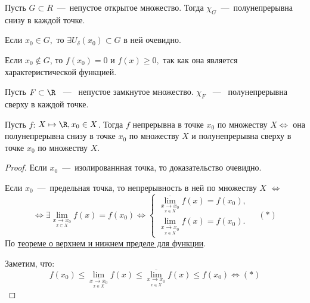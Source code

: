 \begin{example}
    Пусть $ G \subset R$~---~непустое открытое множество. Тогда $\chi_{G}$~---~полунепрерывна снизу в каждой точке.

    Если $x_{0} \in G,$ то $\exists U_{\delta} (x_{0}) \subset G$ в ней очевидно.

    Если $x_{0} \notin G$, то $f(x_{0}) = 0$ и $f(x) \geq 0,$ так как она является характеристической функцией.
\end{example}

\begin{example}
    Пусть $ F \subset \R$ ~---~ непустое замкнутое множество. $\chi_{F}$ ~---~ полунепрерывна сверху в каждой точке.
\end{example}

\begin{theorem}
    Пусть $f$: $X \mapsto \R, x_{0} \in X$. Тогда $f$  непрерывна в точке $x_{0}$ по множеству $X \Leftrightarrow$ она полунепрерывна снизу в точке $x_{0}$ по множеству $X$ и полунепрерывна сверху в точке $x_{0}$ по множеству $X$.
\end{theorem}

\begin{proof}
    Если $x_{0}$~---~изолированнная точка, то доказательство очевидно.

    Если $x_{0}$~---~предельная точка, то непрерывность в ней по множеству $X$ $\Leftrightarrow$
    $$\Leftrightarrow \exists \lim\limits_{\underset{x \subset X}{x \to x_{0}}} f(x) = f(x_{0}) \Leftrightarrow \begin{cases}
        \overline{\lim\limits_{\underset{x \in X}{x\to x_0}}} f(x) =  f(x_{0}), \\
        \lim\limits_{\overline{\underset{x \in X}{x\to x_0}}} f(x) =  f(x_{0}).
    \end{cases} \quad (*)$$
    По \hyperlink{thrm4.10}{теореме о верхнем и нижнем пределе для функции}.

    Заметим, что:
    $$f(x_{0}) \leq\lim\limits_{\overline{\underset{x \in X}{x\to x_0}}} f(x) \leq \overline{\lim\limits_{\underset{x \in X}{x\to x_0}}} f(x) \leq f(x_{0}) \Leftrightarrow (*)$$
\end{proof}
